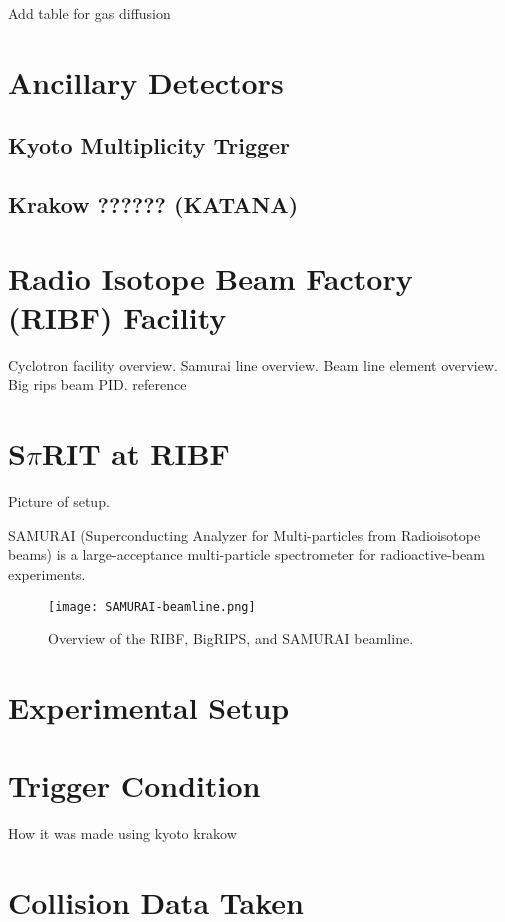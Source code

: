Add table for gas diffusion 


\section{Ancillary Detectors }
\subsection{Kyoto Multiplicity Trigger}
\subsection{Krakow ?????? (KATANA)}

\section{Radio Isotope Beam Factory (RIBF) Facility }
Cyclotron facility overview.
Samurai line overview.
Beam line element overview.
Big rips beam PID. reference 


\section{S$\pi$RIT at RIBF}
Picture of setup. 




SAMURAI (Superconducting Analyzer for Multi-particles from Radioisotope beams) is a large-acceptance multi-particle spectrometer for radioactive-beam experiments.
\begin{figure}[H]
\texttt{[image: SAMURAI-beamline.png]}
\caption{Overview of the RIBF, BigRIPS, and SAMURAI beamline.}
\label{fig:sambl}
\end{figure}

\section{Experimental Setup}

\section{Trigger Condition}
How it was made using kyoto krakow

\section{Collision Data Taken}

